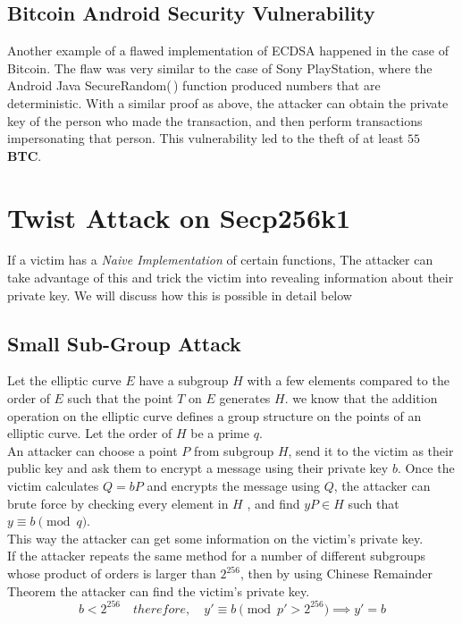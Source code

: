 \subsection{Bitcoin Android Security Vulnerability}
Another example of a flawed implementation of ECDSA happened in the case of Bitcoin. The flaw was very similar to the case of Sony PlayStation, where the Android Java SecureRandom(\,) function produced numbers that are deterministic. With a similar proof as above, the attacker can obtain the private key of the person who made the transaction, and then perform transactions impersonating that person. This vulnerability led to the theft of at least $55$ \textbf{BTC}. 

\section{Twist Attack on Secp256k1}
If a victim has a \textit{Naive Implementation} of certain functions, The attacker can take advantage of this and trick the victim into revealing information about their private key. We will discuss how this is possible in detail below

\subsection{Small Sub-Group Attack}
Let the elliptic curve $E$ have a subgroup $H$ with a few elements compared to the order of $E$ such that the point $T$ on $E$ generates $H$. we know that the addition operation on the elliptic curve defines a group structure on the points of an elliptic curve. Let the order of $H$ be a prime $q$. \\
An attacker can choose a point $P$ from subgroup $H$, send it to the victim as their public key and ask them to encrypt a message using their private key $b$. Once the victim calculates $Q = bP$ and encrypts the message using $Q$, the attacker can brute force by checking every element in $H$ , and find $yP \in H$ such that $y \equiv b \pmod{q}$.\\
This way the attacker can get some information on the victim's private key.\\
If the attacker repeats the same method for a number of different subgroups whose product of orders is larger than $2^{256}$, then by using Chinese Remainder Theorem the attacker can find the victim's private key.
\[b < 2^{256} \quad therefore, \quad y' \equiv b \pmod{p'>2^{256}} \implies y' = b\]
\newpage 

